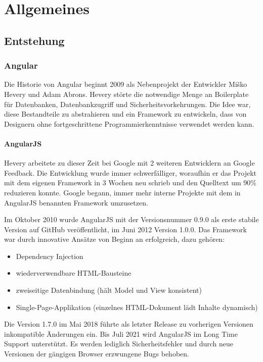 \chapter{Allgemeines}

\section{Entstehung}

\subsection{Angular}
Die Historie von Angular beginnt 2009 als Nebenprojekt der Entwickler Miško Hevery und Adam Abrons. Hevery störte die notwendige Menge an Boilerplate für Datenbanken, Datenbankzugriff und Sicherheitsvorkehrungen. Die Idee war, diese Bestandteile zu abstrahieren und ein Framework zu entwickeln, dass von Designern ohne fortgeschrittene Programmierkenntnisse verwendet werden kann. 

\subsubsection{AngularJS}
Hevery arbeitete zu dieser Zeit bei Google mit 2 weiteren Entwicklern an Google Feedback. Die Entwicklung wurde immer schwerfälliger, woraufhin er das Projekt mit dem eigenen Framework in 3 Wochen neu schrieb und den Quelltext um 90\% reduzieren konnte. Google begann, immer mehr interne Projekte mit dem in AngularJS benannten Framework umzusetzen.

Im Oktober 2010 wurde AngularJS mit der Versionsnummer 0.9.0 als erste stabile Version auf GitHub veröffentlicht, im Juni 2012 Version 1.0.0. Das Framework war durch innovative Ansätze von Beginn an erfolgreich, dazu gehören:
\begin{itemize}
  \item Dependency Injection
  \item wiederverwendbare HTML-Bausteine
  \item zweiseitige Datenbindung (hält Model und View konsistent)
  \item Single-Page-Applikation (einzelnes HTML-Dokument lädt Inhalte dynamisch)
\end{itemize}

Die Version 1.7.0 im Mai 2018 führte als letzter Release zu vorherigen Versionen inkompatible Änderungen ein. Bis Juli 2021 wird AngularJS im Long Time Support unterstützt. Es werden lediglich Sicherheitsfehler und durch neue Versionen der gängigen Browser erzwungene Bugs behoben.\cite{NgJsHistory}\cite{NgConf2014}

